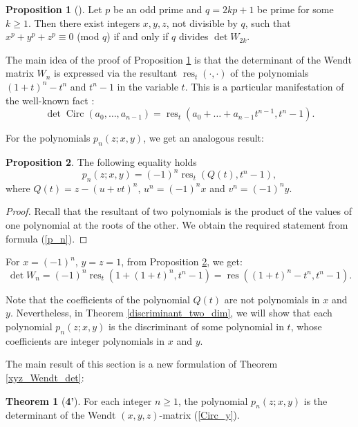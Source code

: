 \documentclass[14pt, dvipsnames]{extarticle}
\theoremstyle{definition}
\newtheorem{prop}{Proposition}
\newtheorem*{theoremprime}{Theorem}
\theoremstyle{definition}
\theoremstyle{remark}
\DeclareMathOperator{\res}{\mathrm{res}}
\DeclareMathOperator{\Circ}{\mathrm{Circ}}
\begin{document}
\begin{prop}[\cite{Wendt}]\label{Wendt_criterion}
Let $p$ be an odd prime and $q = 2kp+1$ be prime for some $k \geqslant 1$. Then there exist integers $x, y, z$, not divisible by $q$, such that $x^p + y^p + z^p \equiv 0$ (mod $q$) if and only if $q$ divides $\det W_{2k}$.
\end{prop}

The main idea of the proof of Proposition \ref{Wendt_criterion} is that the determinant of the Wendt matrix $W_n$ is expressed \cite[Chapter IV, {\bf (2a)}]{Fermat_for_amateurs} via the resultant $\res_t(\cdot, \cdot)$ of the polynomials $(1+t)^n - t^n$ and $t^n - 1$ in the variable $t$. This is a particular manifestation of the well-known fact \cite[Chapter IV, Lemma 2.1]{Fermat_for_amateurs}:
$$\det \Circ(a_0, \dots, a_{n-1}) = \res_{t}(a_0 + \dots + a_{n-1}t^{n-1}, t^n - 1).$$

For the polynomials $p_n(z; x, y)$, we get an analogous result:

\begin{prop}\label{res_p_n}
The following equality holds
$$p_n(z; x, y) = (-1)^{n} \res_{t}(Q(t), t^n - 1),$$
where $Q(t) = z - (u + vt)^n$, $u^n = (-1)^nx$ and $v^n = (-1)^ny$.
\end{prop}

\begin{proof}
Recall that the resultant of two polynomials is the product of the values of one polynomial at the roots of the other. We obtain the required statement from formula (\ref{p_n}). 
\end{proof}

For $x = (-1)^n$,  $y = z = 1$, from Proposition \ref{res_p_n}, we get:
$$\det W_n = (-1)^n\res_t(1 + (1+t)^n, t^n - 1) = \res((1+t)^n - t^n, t^n - 1).$$ 

Note that the coefficients of the polynomial $Q(t)$ are not polynomials in $x$ and $y$. Nevertheless, in Theorem \ref{discriminant_two_dim}, we will show that each polynomial $p_n(z; x, y)$ is the discriminant of some polynomial in $t$, whose coefficients are integer polynomials in $x$ and $y$. 

The main result of this section is a new formulation of Theorem \ref{xyz_Wendt_det}:

\begin{theoremprime}[{\bf 4'}]\label{xyz_Wendt_and_p_n}
For each integer $n\geqslant 1$, the polynomial $p_n(z; x, y)$ is the determinant of the  Wendt $(x, y, z)$-matrix (\ref{Circ_y}).
\end{theoremprime}
\end{document}
